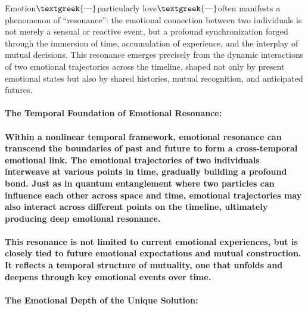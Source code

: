 \documentclass[a4paper]{article}
\begin{document}
Emotion$\text{\textgreek{—}}$particularly love$\text{\textgreek{—}}$often manifests a phenomenon of “resonance”: the
emotional connection between two individuals is not merely a sensual or reactive event, but a profound synchronization
forged through the immersion of time, accumulation of experience, and the interplay of mutual decisions. This resonance
emerges precisely from the dynamic interactions of two emotional trajectories across the timeline, shaped not only by
present emotional states but also by shared histories, mutual recognition, and anticipated futures.

\paragraph[The Temporal Foundation of Emotional Resonance: ]{\textbf{The Temporal Foundation of Emotional Resonance: }}
\paragraph[Within a nonlinear temporal framework, emotional resonance can transcend the boundaries of past and future to
form a cross{}-temporal emotional link. The emotional trajectories of two individuals interweave at various points in
time, gradually building a profound bond. Just as in quantum entanglement where two particles can influence each other
across space and time, emotional trajectories may also interact across different points on the timeline, ultimately
producing deep emotional resonance.]{Within a nonlinear temporal framework, emotional resonance can transcend the
boundaries of past and future to form a cross-temporal emotional link. The emotional trajectories of two individuals
interweave at various points in time, gradually building a profound bond. Just as in quantum entanglement where two
particles can influence each other across space and time, emotional trajectories may also interact across different
points on the timeline, ultimately producing deep emotional resonance.}
\paragraph{This resonance is not limited to current emotional experiences, but is closely tied to future emotional
expectations and mutual construction. It reflects a temporal structure of mutuality, one that unfolds and deepens
through key emotional events over time.}
\paragraph[The Emotional Depth of the Unique Solution: ]{\textbf{The Emotional Depth of the Unique Solution: }}
\end{document}
